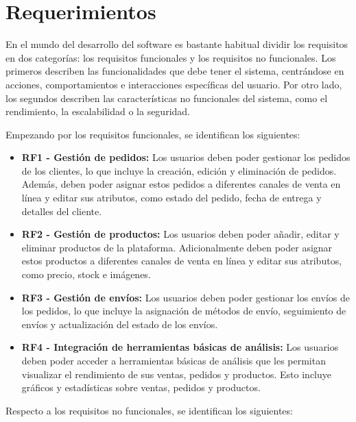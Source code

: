 \section{Requerimientos}
\label{intro:sec:reqs}

En el mundo del desarrollo del software es bastante habitual dividir los requisitos en dos categorías: los requisitos funcionales y los requisitos no funcionales. Los primeros describen las funcionalidades que debe tener el sistema, centrándose en acciones, comportamientos e interacciones específicas del usuario. Por otro lado, los segundos describen las características no funcionales del sistema, como el rendimiento, la escalabilidad o la seguridad.

Empezando por los requisitos funcionales, se identifican los siguientes:

\begin{itemize}
    \item \textbf{RF1 - Gestión de pedidos:} Los usuarios deben poder gestionar los pedidos de los clientes, lo que incluye la creación, edición y eliminación de pedidos. Además, deben poder asignar estos pedidos a diferentes canales de venta en línea y editar sus atributos, como estado del pedido, fecha de entrega y detalles del cliente.
    \item \textbf{RF2 - Gestión de productos:} Los usuarios deben poder añadir, editar y eliminar productos de la plataforma. Adicionalmente deben poder asignar estos productos a diferentes canales de venta en línea y editar sus atributos, como precio, stock e imágenes.
    \item \textbf{RF3 - Gestión de envíos:} Los usuarios deben poder gestionar los envíos de los pedidos, lo que incluye la asignación de métodos de envío, seguimiento de envíos y actualización del estado de los envíos.
    \item \textbf{RF4 - Integración de herramientas básicas de análisis:} Los usuarios deben poder acceder a herramientas básicas de análisis que les permitan visualizar el rendimiento de sus ventas, pedidos y productos. Esto incluye gráficos y estadísticas sobre ventas, pedidos y productos.
\end{itemize}

Respecto a los requisitos no funcionales, se identifican los siguientes:

